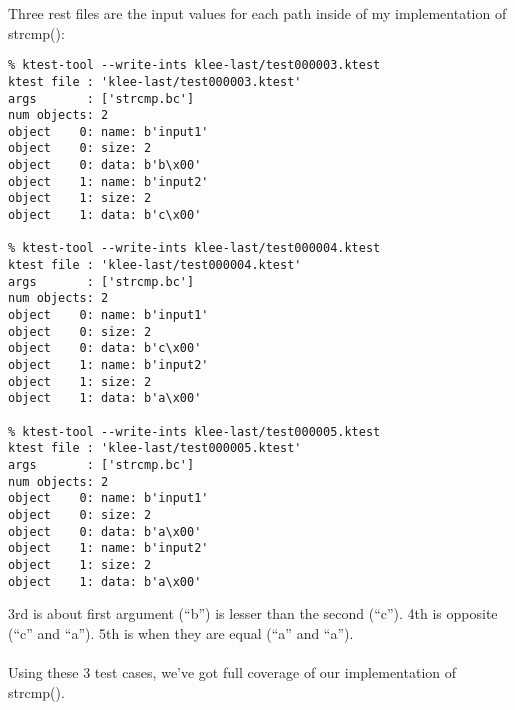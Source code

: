 Three rest files are the input values for each path inside of my implementation of strcmp():

\begin{lstlisting}
% ktest-tool --write-ints klee-last/test000003.ktest
ktest file : 'klee-last/test000003.ktest'
args       : ['strcmp.bc']
num objects: 2
object    0: name: b'input1'
object    0: size: 2
object    0: data: b'b\x00'
object    1: name: b'input2'
object    1: size: 2
object    1: data: b'c\x00'

% ktest-tool --write-ints klee-last/test000004.ktest
ktest file : 'klee-last/test000004.ktest'
args       : ['strcmp.bc']
num objects: 2
object    0: name: b'input1'
object    0: size: 2
object    0: data: b'c\x00'
object    1: name: b'input2'
object    1: size: 2
object    1: data: b'a\x00'

% ktest-tool --write-ints klee-last/test000005.ktest
ktest file : 'klee-last/test000005.ktest'
args       : ['strcmp.bc']
num objects: 2
object    0: name: b'input1'
object    0: size: 2
object    0: data: b'a\x00'
object    1: name: b'input2'
object    1: size: 2
object    1: data: b'a\x00'
\end{lstlisting}

3rd is about first argument (``b'') is lesser than the second (``c'').
4th is opposite (``c'' and ``a'').
5th is when they are equal (``a'' and ``a'').\\
\\
Using these 3 test cases, we've got full coverage of our implementation of strcmp().

